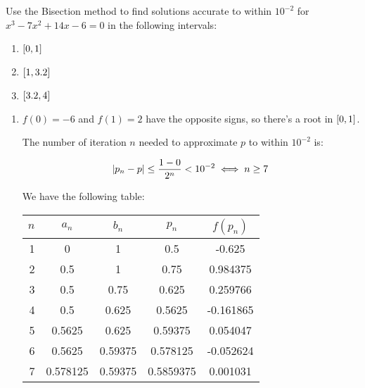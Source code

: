 \documentclass[../../Assignments.tex]{subfiles}
\begin{document}
\begin{exercise}
    Use the Bisection method to find solutions accurate to within \(10^{-2}\)
    for \(x^3 - 7x^2 + 14x - 6 = 0\) in the following intervals:

    \begin{enumerate}[label=(\alph*)]
        \item \(\interval{0}{1}\)
        \item \(\interval{1}{\num{3.2}}\)
        \item \(\interval{\num{3.2}}{4}\)
    \end{enumerate}
\end{exercise}

\begin{solution}
    \begin{enumerate}[label=(\alph*)]
        \item \(f(0) = -6\) and \(f(1) = 2\) have the opposite signs, so there's
            a root in \(\interval{0}{1}\).

            The number of iteration \(n\) needed to approximate \(p\) to within
            \(10^{-2}\) is:

            \[\abs{p_n - p} \leq \frac{1 - 0}{2^n} < 10^{-2} \iff n \geq 7\]

            We have the following table:

            \begin{table}[hbt!]
                \centering
                \begin{tabular}{r S[table-format=1.6] S[table-format=1.5] S[table-format=1.7] S[table-format=-1.6]}
                    \toprule
                    \(n\)  &  {\(a_n\)}  &  {\(b_n\)}  &  {\(p_n\)}  &  {\(f(p_n)\)}  \\
                      &  0          &  1          &  0.5        &  -0.625        \\
                        2  &  0.5        &  1          &  0.75       &   0.984375     \\
                        3  &  0.5        &  0.75       &  0.625      &   0.259766     \\
                        4  &  0.5        &  0.625      &  0.5625     &  -0.161865     \\
                        5  &  0.5625     &  0.625      &  0.59375    &   0.054047     \\
                        6  &  0.5625     &  0.59375    &  0.578125   &  -0.052624     \\
                        7  &  0.578125   &  0.59375    &  0.5859375  &   0.001031     \\
                    \bottomrule
                \end{tabular}
            \end{table}


\end{enumerate}
\end{solution}
\end{document}
